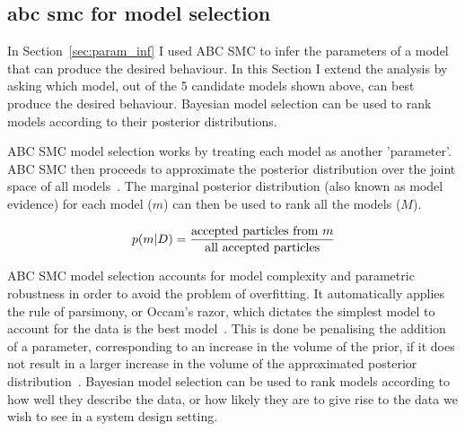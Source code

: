 \subsection{\acrshort{abc} \acrshort{smc} for model selection}

In Section~\ref{sec:param_inf} I used ABC SMC to infer the parameters of a model that can produce the desired behaviour. In this Section I extend the analysis by asking which model, out of the 5 candidate models shown above, can best produce the desired behaviour. Bayesian model selection can be used to rank models according to their posterior distributions. 

ABC SMC model selection works by treating each model as another 'parameter'. ABC SMC then proceeds to approximate the posterior distribution over the joint space of all models~\autocite{Toni:2009tr}. The marginal posterior distribution (also known as model evidence) for each model ($m$) can then be used to rank all the models ($M$). 

\begin{align}
	p(m|D) = \frac{\textnormal{accepted particles from } m}{\textnormal{all accepted particles}}
\end{align}

ABC SMC model selection accounts for model complexity and parametric robustness in order to avoid the problem of overfitting. It automatically applies the rule of parsimony, or Occam's razor, which dictates the simplest model to account for the data is the best model~\autocite{Toni:2010}. This is done be penalising the addition of a parameter, corresponding to an increase in the volume of the prior,  if it does not result in a larger increase in the volume of the approximated posterior distribution~\autocite{Woods:2016eh}.  Bayesian model selection can be used to rank models according to how well they describe the data, or how likely they are to give rise to the data we wish to see in a system design setting.  


    
